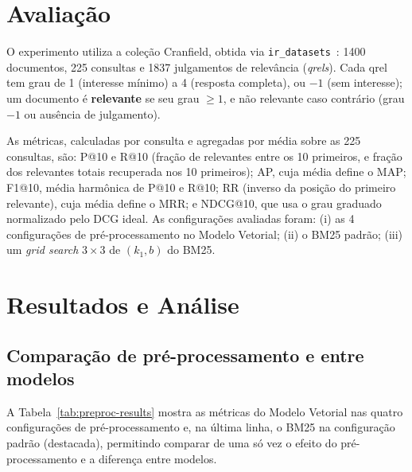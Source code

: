 \documentclass[runningheads]{llncs}
\begin{document}
\vspace{-1.0em}
\section{Avaliação}

O experimento utiliza a coleção Cranfield, obtida via \texttt{ir\_datasets}~\cite{ref_irdatasets}: 1400 documentos, 225 consultas e 1837 julgamentos de relevância (\emph{qrels}). Cada qrel tem grau de 1 (interesse mínimo) a 4 (resposta completa), ou $-1$ (sem interesse); um documento é \textbf{relevante} se seu grau $\geq 1$, e não relevante caso contrário (grau $-1$ ou ausência de julgamento).

As métricas, calculadas por consulta e agregadas por média sobre as 225 consultas, são: P@10 e R@10 (fração de relevantes entre os 10 primeiros, e fração dos relevantes totais recuperada nos 10 primeiros); AP, cuja média define o MAP; F1@10, média harmônica de P@10 e R@10; RR (inverso da posição do primeiro relevante), cuja média define o MRR; e NDCG@10, que usa o grau graduado normalizado pelo DCG ideal. As configurações avaliadas foram: (i) as 4 configurações de pré-processamento no Modelo Vetorial; (ii) o BM25 padrão; (iii) um \emph{grid search} $3\times3$ de $(k_1,b)$ do BM25.

\vspace{-1.0em}
\section{Resultados e Análise}

\vspace{-1.0em}
\subsection{Comparação de pré-processamento e entre modelos}

A Tabela~\ref{tab:preproc-results} mostra as métricas do Modelo Vetorial nas quatro configurações de pré-processamento e, na última linha, o BM25 na configuração padrão (destacada), permitindo comparar de uma só vez o efeito do pré-processamento e a diferença entre modelos.
\end{document}
